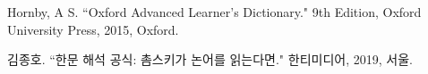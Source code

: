\par Hornby, A S. ``Oxford Advanced Learner's Dictionary." 9th Edition, Oxford University Press, 2015, Oxford.
\par 김종호. ``한문 해석 공식: 촘스키가 논어를 읽는다면." 한티미디어, 2019, 서울.
